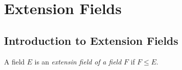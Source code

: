 \chapter{Extension Fields}

\section{Introduction to Extension Fields}

\begin{definition}
    A field $E$ is an \emph{extensin field of a field $F$} if $F \leq E.$
\end{definition}




